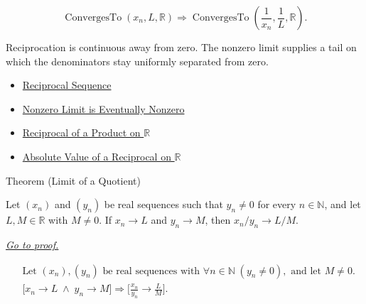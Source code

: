 \begin{remark*}
\[
\operatorname{ConvergesTo}(x_n,L,\mathbb{R})
\Longrightarrow
\operatorname{ConvergesTo}\left(\frac{1}{x_n},\frac{1}{L},\mathbb{R}\right).
\]
\end{remark*}

\begin{remark*}[Interpretation]
Reciprocation is continuous away from zero. The nonzero limit supplies a tail
on which the denominators stay uniformly separated from zero.
\end{remark*}

\begin{dependencies}
\begin{itemize}
  \item \hyperref[def:reciprocal-sequence]{Reciprocal Sequence}
  \item \hyperref[thm:nonzero-limit-eventually-nonzero]{Nonzero Limit is Eventually Nonzero}
  \item \hyperref[thm:reciprocal-of-product-on-r]{Reciprocal of a Product on $\mathbb{R}$}
  \item \hyperref[thm:absolute-value-of-reciprocal-r]{Absolute Value of a Reciprocal on $\mathbb{R}$}
\end{itemize}
\end{dependencies}


\begin{theorembox}{Theorem (Limit of a Quotient)}
\begin{theorem}
\label{thm:limit-of-a-quotient}
Let $(x_n)$ and $(y_n)$ be real sequences such that $y_n\neq 0$ for every
$n\in\mathbb{N}$, and let $L,M\in\mathbb{R}$ with $M\neq 0$. If
$x_n\to L$ and $y_n\to M$, then $x_n/y_n\to L/M$.

\smallskip
\noindent
\hyperref[prf:limit-of-a-quotient]{\textit{Go to proof.}}
\end{theorem}
\end{theorembox}

\begin{remark*}
\[
\begin{aligned}
&\text{Let } (x_n),(y_n) \text{ be real sequences with }
  \forall n\in\mathbb{N}\;(y_n\neq 0), \text{ and let } M\neq 0.\\
&\bigl[
x_n\to L \;\land\; y_n\to M
\bigr]
\Longrightarrow
\bigl[
\frac{x_n}{y_n}\to \frac{L}{M}
\bigr].
\end{aligned}
\]
\end{remark*}

